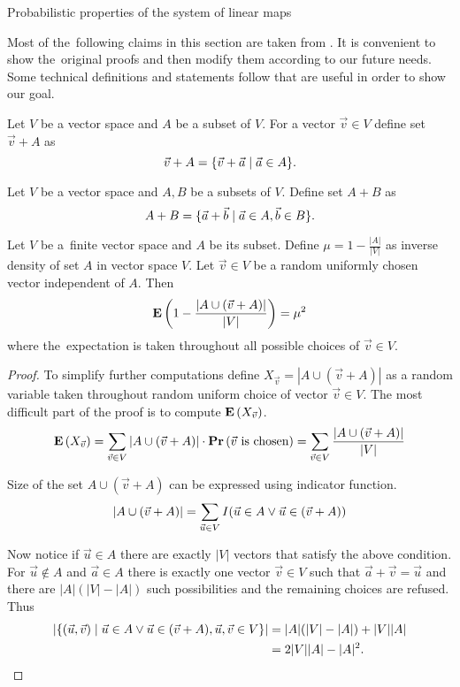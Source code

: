 \begin{section}{Probabilistic properties of the system of linear maps}

Most of the~following claims in this section are taken from \cite{DBLP:journals/jacm/AlonDMPT99}. It is convenient to show the~original proofs and then modify them according to our future needs. Some technical definitions and statements follow that are useful in order to show our goal.

\begin{definition}
Let $V$ be a vector space and $A$ be a subset of $V$. For a vector $\vec{v} \in V$ define set $\vec{v} + A$ as
\[ \vec{v} + A = \{ \vec{v} + \vec{a} \mid \vec{a} \in A \} \text{.} \] 
\end{definition}

\begin{definition}
Let $V$ be a vector space and $A, B$ be a subsets of $V$. Define set $A + B$ as
\[ A + B = \{ \vec{a} + \vec{b} \mid \vec{a} \in A, \vec{b} \in B \} \text{.} \] 
\end{definition}

\begin{lemma}
\label{lemma-choose-random-vector}
Let $V$ be a~finite vector space and $A$ be its subset. Define $\mu = 1 - \frac{|A|}{|V|}$ as inverse density of set $A$ in vector space $V$. Let $\vec{v} \in V$ be a random uniformly chosen vector independent of $A$. Then
\begin{displaymath}
\mathbf{E}\left(1 - \frac{|A \cup (\vec{v} + A)|}{|V|}\right) = \mu^2
\end{displaymath}
where the~expectation is taken throughout all possible choices of $\vec{v} \in V$.

\begin{proof}
To simplify further computations define $X_{\vec{v}} = |A \cup (\vec{v} + A)|$ as a random variable taken throughout random uniform choice of vector $\vec{v} \in V$. The most difficult part of the proof is to compute $\mathbf{E}\left(X_{\vec{v}}\right)$.
\[
\mathbf{E}\left(X_{\vec{v}}\right) = \displaystyle\sum_{\vec{v} \in V} |A \cup (\vec{v} + A)| \cdot \mathbf{Pr}\left(\vec{v} \text{ is chosen}\right) = \displaystyle\sum_{\vec{v} \in V} \frac{|A \cup (\vec{v} + A)|}{|V|}
\]

Size of the set $A \cup (\vec{v} + A)$ can be expressed using indicator function.
\[
|A \cup (\vec{v} + A)| = \displaystyle\sum_{\vec{u} \in V} I(\vec{u} \in A \vee \vec{u} \in (\vec{v} + A)) \\
\]

Now notice if $\vec{u} \in A$ there are exactly $|V|$ vectors that satisfy the above condition. For $\vec{u} \notin A$ and $\vec{a} \in A$ there is exactly one vector $\vec{v} \in V$ such that $\vec{a} + \vec{v} = \vec{u}$ and there are $|A|(|V| - |A|)$ such possibilities and the remaining choices are refused. Thus
\[ 
\begin{split}
|\{(\vec{u}, \vec{v}) \mid \vec{u} \in A \vee \vec{u} \in (\vec{v} + A), \vec{u}, \vec{v} \in V \}| 
	& = |A|(|V| - |A|) + |V||A| \\
	& = 2|V||A| - |A|^2 \text{.} \\
\end{split}
\]


\end{proof}
\end{lemma}
\end{section}
